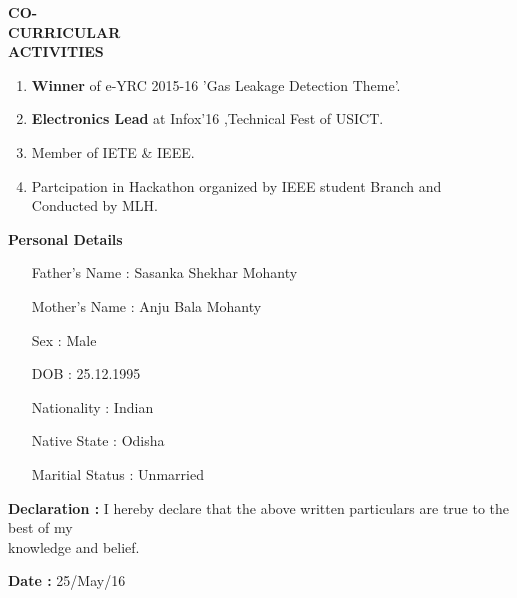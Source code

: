 \documentclass[11pt]{article}
\begin{document}
\begin{flushleft}
{\Large \bf{CO-\\CURRICULAR\\ ACTIVITIES}}
\begin{enumerate}
\addtolength{\itemindent}{1.55in}
\vspace{-0.70in} 
\item {\bf Winner} of e-YRC 2015-16 'Gas Leakage Detection Theme'.
\item {\bf Electronics Lead} at Infox'16 ,Technical Fest of USICT.
\item Member of IETE \& IEEE.
\item Partcipation in Hackathon organized by IEEE student Branch and \\ \hspace{1.68in}Conducted by MLH. 
\end{enumerate}
\end{flushleft}  

\begin{flushleft}
{\Large \bf{Personal Details}}
\begin{enumerate}
\addtolength{\itemindent}{2.2in}
\item[Father's Name : ] Sasanka Shekhar Mohanty	
\item[Mother's Name : ] Anju Bala Mohanty	
\item[Sex : ] Male	
\item[DOB : ] 25.12.1995	
\item[Nationality : ] Indian
\item[Native State : ] Odisha
\item[Maritial Status : ] Unmarried
\end{enumerate}
\end{flushleft}  

\begin{flushleft}
{\Large\bf Declaration : }
 I hereby declare that the above written particulars are true to the best of my \\
\hspace{1.38in}
knowledge and belief.
\end{flushleft}


\begin{flushleft}
{\Large\bf Date : }\hspace{1.7cm} {25/May/16 }
\end{flushleft}
\end{document}

